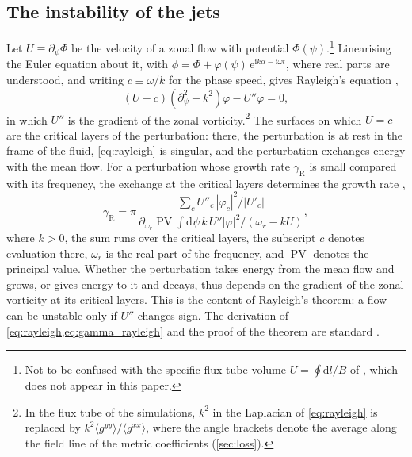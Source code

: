 \documentclass{jpp}
\newcommand{\rmd}{\text{d}}
\newcommand{\rme}{\text{e}}
\newcommand{\rmi}{\text{i}}
\newcommand{\PV}{\operatorname{PV}}
\begin{document}
\subsection{The instability of the jets}\label{sec:rayleigh}

Let \(U \equiv \partial_\psi\Phi\) be the velocity of a zonal flow with potential \(\Phi(\psi)\).\footnote{Not to be confused with the specific flux-tube volume \(U = \oint\rmd l/B\) of \citet{KennedyPlunkLetter}, which does not appear in this paper.} Linearising the Euler equation about it, with \(\phi = \Phi + \varphi(\psi)\,\rme^{\rmi k\alpha - \rmi\omega t}\), where real parts are understood, and writing \(c \equiv \omega/k\) for the phase speed, gives Rayleigh's equation \citep{Rayleigh1880, DrazinReid2004},
\begin{equation}
\left(U - c\right)\left(\partial_\psi^2 - k^2\right)\varphi - U''\varphi = 0,
\label{eq:rayleigh}
\end{equation}
in which \(U''\) is the gradient of the zonal vorticity.\footnote{In the flux tube of the simulations, \(k^2\) in the Laplacian of \cref{eq:rayleigh} is replaced by \(k^2\langle g^{yy}\rangle/\langle g^{xx}\rangle\), where the angle brackets denote the average along the field line of the metric coefficients (\cref{sec:loss}).} The surfaces on which \(U = c\) are the critical layers of the perturbation: there, the perturbation is at rest in the frame of the fluid, \cref{eq:rayleigh} is singular, and the perturbation exchanges energy with the mean flow. For a perturbation whose growth rate \(\gamma_\text{R}\) is small compared with its frequency, the exchange at the critical layers determines the growth rate \citep{Briggs1970},
\begin{equation}
\gamma_\text{R} = \pi\,\frac{\sum_c U''_c\,|\varphi_c|^2/|U'_c|}{\partial_{\omega_r}\PV\!\int\rmd\psi\,k\,U''|\varphi|^2/(\omega_r - kU)},
\label{eq:gamma_rayleigh}
\end{equation}
where \(k > 0\), the sum runs over the critical layers, the subscript \(c\) denotes evaluation there, \(\omega_r\) is the real part of the frequency, and \(\PV\) denotes the principal value. Whether the perturbation takes energy from the mean flow and grows, or gives energy to it and decays, thus depends on the gradient of the zonal vorticity at its critical layers. This is the content of Rayleigh's theorem: a flow can be unstable only if \(U''\) changes sign. The derivation of \cref{eq:rayleigh,eq:gamma_rayleigh} and the proof of the theorem are standard \citep{DrazinReid2004}.
\end{document}
